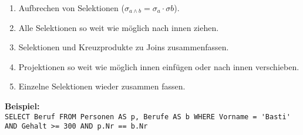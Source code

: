 \documentclass[a4paper,parskip=half*,DIV=15,fontsize=11pt]{scrartcl}
\begin{document}
\begin{enumerate}
  \item Aufbrechen von Selektionen ($\sigma_{a \land b} = \sigma_a \cdot \sigma b$).
  \item Alle Selektionen so weit wie möglich nach innen ziehen.
  \item Selektionen und Kreuzprodukte zu Joins zusammenfassen.
  \item Projektionen so weit wie möglich innen einfügen oder nach innen verschieben.
  \item Einzelne Selektionen wieder zusammen fassen.
\end{enumerate}
\textbf{Beispiel:} \\
{\fontsize{9pt}{10pt}\selectfont\lstinline{SELECT Beruf FROM Personen AS p, Berufe AS b WHERE Vorname = 'Basti' AND Gehalt >= 300 AND p.Nr == b.Nr}} \\
\end{document}
